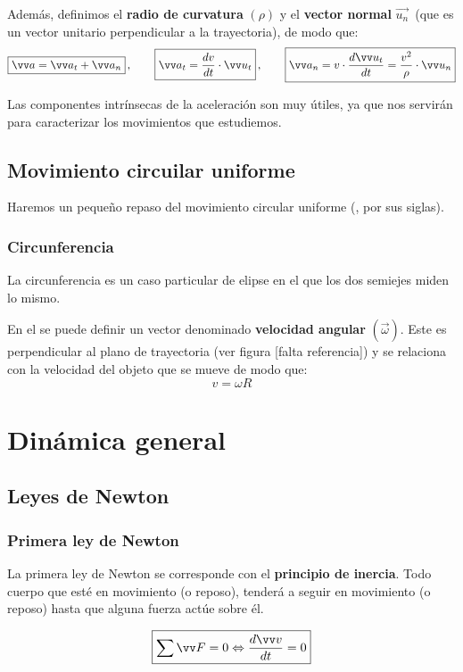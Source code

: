 \documentclass[a4paper]{book}
\begin{document}
Además, definimos el \textbf{radio de curvatura} $(\rho )$ y el \textbf{vector normal} $\vec{u_n}\, $ (que es un vector unitario perpendicular a la trayectoria), de modo que:
\[\boxed{\vec{a} = \vec{a_t} + \vec{a_n}} \, , \qquad
	\boxed{\vec{a_t} = \dv{v}{t}\cdot \vec{u_t}}\, , \qquad
	\boxed{\vec{a_n} = v\cdot \dv{\vec{u_t}}{t} = \frac{v^2}{\rho}\cdot \vec{u_n} }\]

Las componentes intrínsecas de la aceleración son muy útiles, ya que nos servirán para caracterizar los movimientos que estudiemos.

\subsection{Movimiento circuilar uniforme}
Haremos un pequeño repaso del movimiento circular uniforme (\textbf{\mcu}, por sus siglas).

\subsubsection{Circunferencia}
La circunferencia es un caso particular de elipse en el que los dos semiejes miden lo mismo.

En el \mcu\space se puede definir un vector denominado \textbf{velocidad angular} $(\vec{\omega})$. Este es perpendicular al plano de trayectoria (ver figura [falta referencia]) y se relaciona con la velocidad del objeto que se mueve de modo que:
\[v=\omega R\]

\section{Dinámica general}
\subsection{Leyes de Newton}
\subsubsection{Primera ley de Newton}
La primera ley de Newton se corresponde con el \textbf{principio de inercia}. Todo cuerpo que esté en movimiento (o reposo), tenderá a seguir en movimiento (o reposo) hasta que alguna fuerza actúe sobre él.

\begin{equation} \label{eq:primera_ley_Newton}
	\boxed{\sum{\vec{F}} = 0 \Leftrightarrow \dv{\vec{v}}{t} = 0}
\end{equation}
\end{document}
